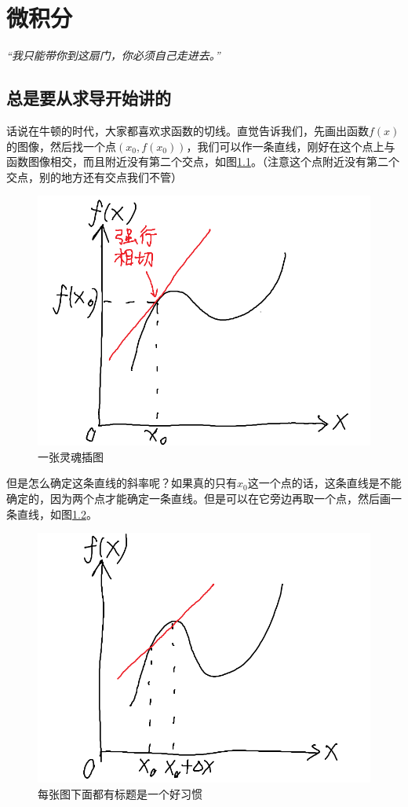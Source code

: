 \chapter{微积分}
\centerline{\it “我只能带你到这扇门，你必须自己走进去。”}
\section{总是要从求导开始讲的}
话说在牛顿的时代，大家都喜欢求函数的切线。直觉告诉我们，先画出函数$f(x)$的图像，然后找一个点$(x_0,f(x_0))$，我们可以作一条直线，刚好在这个点上与函数图像相交，而且附近没有第二个交点，如图\ref{fig-tangent}。（注意这个点附近没有第二个交点，别的地方还有交点我们不管）
\begin{figure}[htb]
\centering
\includegraphics[scale=0.5]{fig/tangent}
\caption{一张灵魂插图}
\label{fig-tangent}
\end{figure}

但是怎么确定这条直线的斜率呢？如果真的只有$x_0$这一个点的话，这条直线是不能确定的，因为两个点才能确定一条直线。但是可以在它旁边再取一个点，然后画一条直线，如图\ref{fig-secant}。
\begin{figure}[htb]
\centering
\includegraphics[scale=0.5]{fig/secant}
\caption{每张图下面都有标题是一个好习惯}
\label{fig-secant}
\end{figure}

